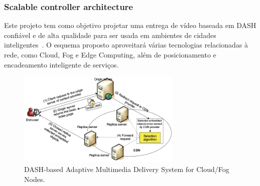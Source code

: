 \subsubsection{Scalable controller architecture}
\label{subsec:sca-contrl-arch}


Este projeto tem como objetivo projetar uma entrega de vídeo baseada em DASH confiável e de alta qualidade para ser usada em ambientes de cidades inteligentes~\cite{gamaUCC2019, KreuzbergerWorkshop2016}. O esquema proposto aproveitará várias tecnologias relacionadas à rede, como Cloud, Fog e Edge Computing, além de posicionamento e encadeamento inteligente de serviços.%


\vspace{0.8cm}
\begin{figure}[htpb]
	\centering
	\includegraphics[width=0.7\textwidth]{img/fig-intro.png}
	\caption{DASH-based Adaptive Multimedia Delivery System for Cloud/Fog Nodes.}
	\label{fig:scenario-arch}
\end{figure}

